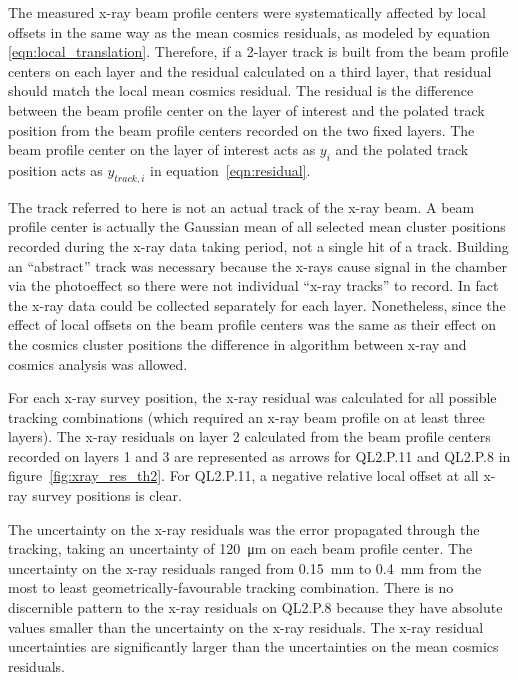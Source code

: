 The measured x-ray beam profile centers were systematically affected by local offsets in the same way as the mean cosmics residuals, as modeled by equation \ref{eqn:local_translation}. Therefore, if a 2-layer track is built from the beam profile centers on each layer and the residual calculated on a third layer, that residual should match the local mean cosmics residual. The residual is the difference between the beam profile center on the layer of interest and the polated track position from the beam profile centers recorded on the two fixed layers. The beam profile center on the layer of interest acts as $y_{i}$ and the polated track position acts as $y_{track, i}$ in equation~\ref{eqn:residual}.

The track referred to here is not an actual track of the x-ray beam. A beam profile center is actually the Gaussian mean of all selected mean cluster positions recorded during the x-ray data taking period, not a single hit of a track. Building an ``abstract'' track was necessary because the x-rays cause signal in the chamber via the photoeffect so there were not individual ``x-ray tracks'' to record. In fact the x-ray data could be collected separately for each layer. Nonetheless, since the effect of local offsets on the beam profile centers was the same as their effect on the cosmics cluster positions the difference in algorithm between x-ray and cosmics analysis was allowed. 

For each x-ray survey position, the x-ray residual was calculated for all possible tracking combinations (which required an x-ray beam profile on at least three layers). The x-ray residuals on layer 2 calculated from the beam profile centers recorded on layers 1 and 3 are represented as arrows  for QL2.P.11 and QL2.P.8 in figure~\ref{fig:xray_res_th2}.  For QL2.P.11, a negative relative local offset at all x-ray survey positions is clear. 

The uncertainty on the x-ray residuals was the error propagated through the tracking, taking an uncertainty of \SI{120}{\micro\meter} on each beam profile center. The uncertainty on the x-ray residuals ranged from \SI{0.15}{mm} to \SI{0.4}{mm} from the most to least geometrically-favourable tracking combination. There is no discernible pattern to the x-ray residuals on QL2.P.8 because they have absolute values smaller than the uncertainty on the x-ray residuals. The x-ray residual uncertainties are significantly larger than the uncertainties on the mean cosmics residuals.

